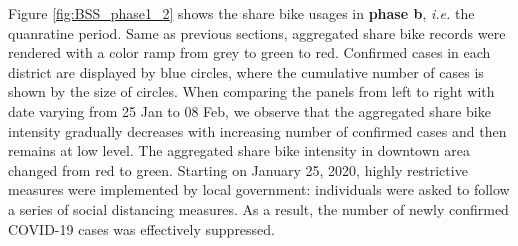 \documentclass[preprints,article,accept,moreauthors,pdftex]{Definitions/mdpi}
\begin{document}
Figure \ref{fig:BSS_phase1_2} shows the share bike usages in \textbf{phase b}, \textit{i.e.} the quanratine period.
Same as previous sections, aggregated share bike records were rendered with a color ramp from grey to green to red.
Confirmed cases in each district are displayed by blue circles, where the cumulative number of cases is shown by the size of circles.
When comparing the panels from left to right with date varying from 25 Jan to 08 Feb, we observe that the aggregated share bike intensity gradually decreases with increasing number of confirmed cases and then remains at low level.
The aggregated share bike intensity in downtown area changed from red to green.
Starting on January 25, 2020, highly restrictive measures were implemented by local government: individuals were asked to follow a series of social distancing measures.
As a result, the number of newly confirmed COVID-19 cases was effectively suppressed.
\end{document}
